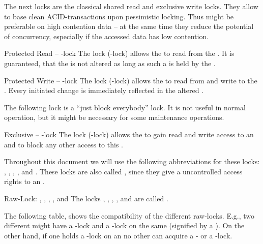 \documentclass[a4paper, 12pt]{book}
\begin{document}
The next locks are the classical shared read and exclusive write locks.
They allow to base clean ACID-transactions upon pessimistic locking. Thus
might be preferable on high contention data -- at the same time they reduce
the potential of concurrency, especially if the accessed data has low
contention.
%
\begin{definition*}{Protected Read -- \PROTREAD-lock}
  The lock  (\PROTREAD-lock) allows the  to read
  from the . It is guaranteed, that the
   is not altered as long as such a  is held by the
  . 
\end{definition*}
%
\begin{definition*}{Protected Write -- \PROTWRITE-lock}
  The lock   (\PROTWRITE-lock) allows the  to read from
  and write to the . Every initiated change is
  immediately reflected in the altered . 
\end{definition*}

The following lock is a ``just block everybody'' lock. It is not
useful in normal operation, but it might be necessary for some maintenance
operations.
\begin{definition*}{Exclusive -- \EXCLUSIVE-lock}
  The lock  (\EXCLUSIVE-lock) allows the  to gain read
  and write access to an  and to block any other
  access to this . 
\end{definition*}

Throughout this document we will use the following abbreviations for these
locks: \UNLOCKED, \CONCREAD, \CONCWRITE, \PROTREAD, \PROTWRITE and
\EXCLUSIVE. These locks are also called , since
they give a  uncontrolled access rights to an .
\begin{definition*}{Raw-Lock: \UNLOCKED, \CONCREAD, \CONCWRITE, \PROTREAD, \PROTWRITE and
    \EXCLUSIVE}
  The locks  \UNLOCKED, \CONCREAD, \CONCWRITE, \PROTREAD, \PROTWRITE and
    \EXCLUSIVE are called . 
\end{definition*}


The following table, shows the compatibility of the different raw-locks. E.g.,
two different  might have a \CONCREAD-lock and a
\PROTWRITE-lock on the same  (signified by a \textbullet). On the
other hand, if one  holds a \PROTWRITE-lock on an 
no other  can acquire a \CONCWRITE- or a \PROTREAD-lock.
\end{document}
